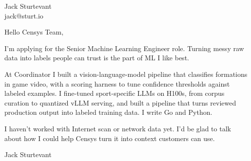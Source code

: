 \documentclass[11pt]{article}
\begin{document}
\raggedright

{\namefont\fontsize{20pt}{24pt}\selectfont Jack Sturtevant}\\[-0.3em]
jack@sturt.io

\vspace{1.2em}

Hello Censys Team,

I'm applying for the Senior Machine Learning Engineer role. Turning messy raw data into labels people can trust is the part of ML I like best.

At Coordinator I built a vision-language-model pipeline that classifies formations in game video, with a scoring harness to tune confidence thresholds against labeled examples. I fine-tuned sport-specific LLMs on H100s, from corpus curation to quantized vLLM serving, and built a pipeline that turns reviewed production output into labeled training data. I write Go and Python.

I haven't worked with Internet scan or network data yet. I'd be glad to talk about how I could help Censys turn it into context customers can use.

\vspace{0.6em}
Jack Sturtevant
\end{document}
